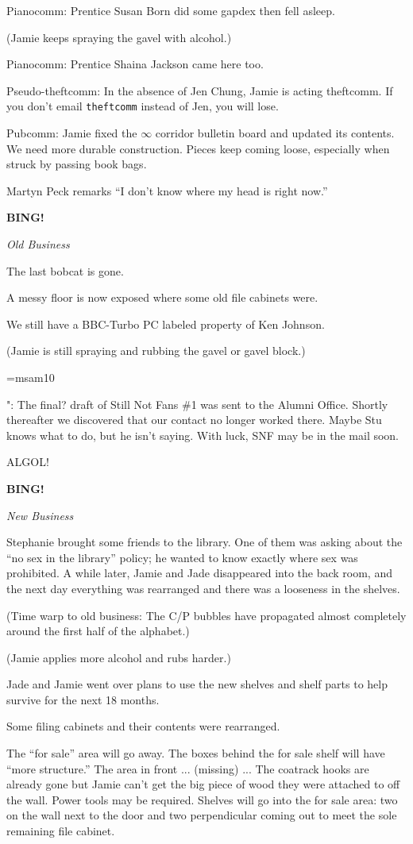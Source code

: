 \documentclass[12pt]{article}
\newcommand{\bing}{{\bf BING!} }
\newcommand{\goto}[1]{\bing \vskip 12pt \centerline{{\em{#1}}}}
\begin{document}
Pianocomm: Prentice Susan Born did some gapdex then fell asleep.

(Jamie keeps spraying the gavel with alcohol.)

Pianocomm: Prentice Shaina Jackson came here too.

Pseudo-theftcomm: In the absence of Jen Chung, Jamie is acting theftcomm.
If you don't email {\tt theftcomm} instead of Jen, you will lose.

Pubcomm: Jamie fixed the $\infty$ corridor bulletin board and updated its
contents.  We need more durable construction.  Pieces keep coming loose,
especially when struck by passing book bags.

Martyn Peck remarks ``I don't know where my head is right now.''

\goto{Old Business}

The last bobcat is gone.

A messy floor is now exposed where some old file cabinets were.

We still have a BBC-Turbo PC labeled property of Ken Johnson.

(Jamie is still spraying and rubbing the gavel or gavel block.)

\font\sym=msam10

{\sym "}: The final? draft of Still Not Fans \#1 was sent to the Alumni Office.
Shortly thereafter we discovered that our contact no longer worked there.
Maybe Stu knows what to do, but he isn't saying.  With luck, SNF may be
in the mail soon.

ALGOL!

\goto{New Business}

Stephanie brought some friends to the library.  One of them was asking about
the ``no sex in the library'' policy; he wanted to know exactly where sex was
prohibited.  A while later, Jamie and Jade disappeared into the back room, and
the next day everything was rearranged and there was a looseness in the shelves.

(Time warp to old business: The C/P bubbles have propagated almost completely
around the first half of the alphabet.)

(Jamie applies more alcohol and rubs harder.)

Jade and Jamie went over plans to use the new shelves and shelf parts
to help survive for the next 18 months.

Some filing cabinets and their contents were rearranged.

The ``for sale'' area will go away.  The boxes behind the for sale shelf
will have ``more structure.''  The area in front ... (missing) ...
The coatrack hooks are already gone but Jamie can't get the big piece
of wood they were attached to off the wall.  Power tools may be required.
Shelves will go into the for sale area: two on the wall next to the door
and two perpendicular coming out to meet the sole remaining file cabinet.
\end{document}
